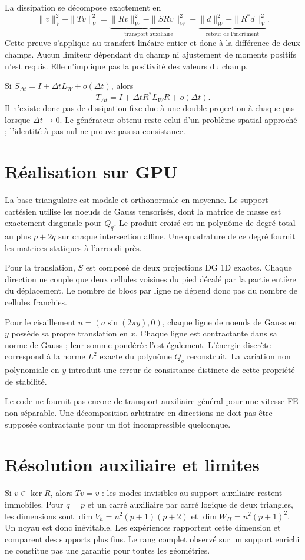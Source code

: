 \documentclass[11pt,a4paper]{article}
\begin{document}
La dissipation se décompose exactement en
\[
 \|v\|_V^2-\|Tv\|_V^2
 =\underbrace{\|Rv\|_W^2-\|SRv\|_W^2}_{\text{transport auxiliaire}}
 +\underbrace{\|d\|_W^2-\|R^*d\|_V^2}_{\text{retour de l'incrément}}.
\]
Cette preuve s'applique au transfert linéaire entier et donc à la différence
de deux champs. Aucun limiteur dépendant du champ ni ajustement de moments
positifs n'est requis. Elle n'implique pas la positivité des valeurs du champ.

Si $S_{\Delta t}=I+\Delta t L_W+o(\Delta t)$, alors
\[
 T_{\Delta t}=I+\Delta t R^*L_WR+o(\Delta t).
\]
Il n'existe donc pas de dissipation fixe due à une double projection à
chaque pas lorsque $\Delta t\to0$. Le générateur obtenu reste celui d'un
problème spatial approché ; l'identité à pas nul ne prouve pas sa consistance.

\section{Réalisation sur GPU}
La base triangulaire est modale et orthonormale en moyenne. Le support
cartésien utilise les noeuds de Gauss tensorisés, dont la matrice de masse
est exactement diagonale pour $Q_q$. Le produit croisé est un polynôme de
degré total au plus $p+2q$ sur chaque intersection affine. Une quadrature
de ce degré fournit les matrices statiques à l'arrondi près.

Pour la translation, $S$ est composé de deux projections DG 1D exactes.
Chaque direction ne couple que deux cellules voisines du pied décalé par
la partie entière du déplacement. Le nombre de blocs par ligne ne dépend
donc pas du nombre de cellules franchies.

Pour le cisaillement $u=(a\sin(2\pi y),0)$, chaque ligne de noeuds de Gauss
en $y$ possède sa propre translation en $x$. Chaque ligne est contractante
dans sa norme de Gauss ; leur somme pondérée l'est également. L'énergie
discrète correspond à la norme $L^2$ exacte du polynôme $Q_q$ reconstruit.
La variation non polynomiale en $y$ introduit une erreur de consistance
distincte de cette propriété de stabilité.

Le code ne fournit pas encore de transport auxiliaire général pour une
vitesse FE non séparable. Une décomposition arbitraire en directions ne
doit pas être supposée contractante pour un flot incompressible quelconque.

\section{Résolution auxiliaire et limites}
Si $v\in\ker R$, alors $Tv=v$ : les modes invisibles au support auxiliaire
restent immobiles. Pour $q=p$ et un carré auxiliaire par carré logique de
deux triangles, les dimensions sont $\dim V_h=n^2(p+1)(p+2)$ et
$\dim W_H=n^2(p+1)^2$. Un noyau est donc inévitable. Les expériences
rapportent cette dimension et comparent des supports plus fins. Le rang
complet observé sur un support enrichi ne constitue pas une garantie pour
toutes les géométries.
\end{document}
